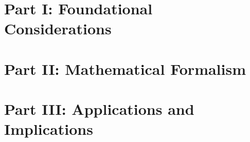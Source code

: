 \documentclass[a4paper,12pt]{article}
\begin{document}
\newpage
    \tableofcontents

    

    \newpage \section*{Part I: Foundational Considerations}\label{sec:Part-1} 
    
    

    \newpage \section*{Part II: Mathematical Formalism}\label{sec:Part-2} 
    
    
    
    
    
    
    
    
    
    


    \newpage \section*{Part III: Applications and Implications}\label{sec:Part-3} 
    
    
    
    
    


    \newpage \appendix \label{sec:Part-4} \label{appendix:1}
    \label{appendix:2}
    \label{appendix:maxwell_appendix}
    \label{appendix:TimeDilation}
    \label{appendix:5}
    \label{appendix:6}
    \label{appendix:alpha}
    \label{appendix:8}
    \label{appendix:9}
    \label{appendix:10}
    \label{appendix:11}

    
    
\end{document}
